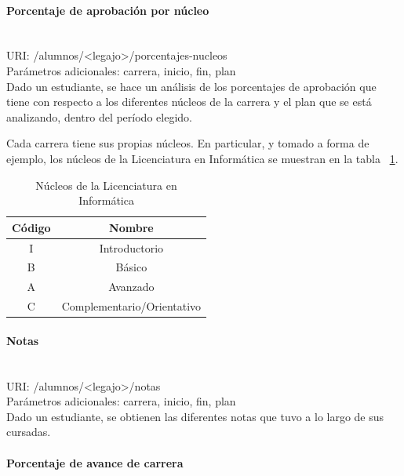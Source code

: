 \paragraph{Porcentaje de aprobación por núcleo}\mbox{}\\

URI: /alumnos/<legajo>/porcentajes-nucleos \\

Parámetros adicionales: carrera, inicio, fin, plan \\

Dado un estudiante, se hace un análisis de los porcentajes de aprobación que tiene con respecto a los diferentes núcleos de la carrera y el plan que se está analizando, dentro del período elegido.

Cada carrera tiene sus propias núcleos. En particular, y tomado a forma de ejemplo, los núcleos de la Licenciatura en Informática se muestran en la tabla ~\ref{tab:tabla_nucleos}.

\begin{table}[!htbp]
    \centering
    \makegapedcells
    \begin{tabular}{|c|c|}
    \hline
    Código & Nombre \\ \hline
    I & Introductorio \\ \hline
    B & Básico\\ \hline
    A & Avanzado \\ \hline
    C & Complementario/Orientativo \\ \hline
    \end{tabular}
    \caption{Núcleos de la Licenciatura en Informática}
    \label{tab:tabla_nucleos}
\end{table}


\paragraph{Notas}\mbox{}\\

URI: /alumnos/<legajo>/notas \\

Parámetros adicionales: carrera, inicio, fin, plan \\

Dado un estudiante, se obtienen las diferentes notas que tuvo a lo largo de sus cursadas.

\paragraph{Porcentaje de avance de carrera}\mbox{}\\

